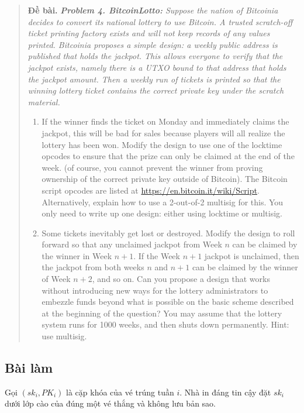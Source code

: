 \documentclass[12pt,a4paper]{article}
\newenvironment{summarybox}
  {\begin{quote}\footnotesize\color{darkgray}\textbf{Đề bài.}\;\itshape}
  {\end{quote}}
\newcommand{\solution}{\subsection*{Bài làm}}
\begin{document}
\begin{summarybox}
\textbf{Problem 4. BitcoinLotto:}
Suppose the nation of Bitcoinia decides to convert its national lottery to use
Bitcoin. A trusted scratch-off ticket printing factory exists and will not
keep records of any values printed. Bitcoinia proposes a simple design: a
weekly public address is published that holds the jackpot. This allows
everyone to verify that the jackpot exists, namely there is a UTXO bound to
that address that holds the jackpot amount. Then a weekly run of tickets is
printed so that the winning lottery ticket contains the correct private key
under the scratch material.

\begin{enumerate}[label=\alph*.,leftmargin=1.5em]
  \item If the winner finds the ticket on Monday and immediately claims the
        jackpot, this will be bad for sales because players will all realize
        the lottery has been won. Modify the design to use one of the locktime
        opcodes to ensure that the prize can only be claimed at the end of the
        week. (of course, you cannot prevent the winner from proving ownership
        of the correct private key outside of Bitcoin). The Bitcoin script
        opcodes are listed at {\normalfont\url{https://en.bitcoin.it/wiki/Script}}.
        Alternatively, explain how to use a 2-out-of-2 multisig for this. You
        only need to write up one design: either using locktime or multisig.
  \item Some tickets inevitably get lost or destroyed. Modify the design to
        roll forward so that any unclaimed jackpot from Week $n$ can be
        claimed by the winner in Week $n+1$. If the Week $n+1$ jackpot is
        unclaimed, then the jackpot from both weeks $n$ and $n+1$ can be
        claimed by the winner of Week $n+2$, and so on. Can you propose a
        design that works without introducing new ways for the lottery
        administrators to embezzle funds beyond what is possible on the basic
        scheme described at the beginning of the question? You may assume that
        the lottery system runs for 1000 weeks, and then shuts down
        permanently. Hint: use multisig.
\end{enumerate}
\end{summarybox}

\solution

Gọi $(sk_i,PK_i)$ là cặp khóa của vé trúng tuần $i$. Nhà in đáng tin cậy đặt
$sk_i$ dưới lớp cào của đúng một vé thắng và không lưu bản sao.
\end{document}
